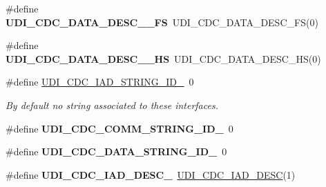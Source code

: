 \begin{DoxyCompactItemize}
\item 
\hypertarget{group__udi__cdc__group__desc_ga56e237a1c0c449161644d244877e7a95}{\#define {\bfseries U\-D\-I\-\_\-\-C\-D\-C\-\_\-\-D\-A\-T\-A\-\_\-\-D\-E\-S\-C\-\_\-\_\-\-F\-S}~U\-D\-I\-\_\-\-C\-D\-C\-\_\-\-D\-A\-T\-A\-\_\-\-D\-E\-S\-C\-\_\-\-F\-S(0)}\label{group__udi__cdc__group__desc_ga56e237a1c0c449161644d244877e7a95}

\item 
\hypertarget{group__udi__cdc__group__desc_ga396459a6e02658a9ae0d6328f0e83e5b}{\#define {\bfseries U\-D\-I\-\_\-\-C\-D\-C\-\_\-\-D\-A\-T\-A\-\_\-\-D\-E\-S\-C\-\_\-\_\-\-H\-S}~U\-D\-I\-\_\-\-C\-D\-C\-\_\-\-D\-A\-T\-A\-\_\-\-D\-E\-S\-C\-\_\-\-H\-S(0)}\label{group__udi__cdc__group__desc_ga396459a6e02658a9ae0d6328f0e83e5b}

\item 
\hypertarget{group__udi__cdc__group__desc_gae988cbd24762b9bd9d29252d2583566f}{\#define \hyperlink{group__udi__cdc__group__desc_gae988cbd24762b9bd9d29252d2583566f}{U\-D\-I\-\_\-\-C\-D\-C\-\_\-\-I\-A\-D\-\_\-\-S\-T\-R\-I\-N\-G\-\_\-\-I\-D\-\_}~0}\label{group__udi__cdc__group__desc_gae988cbd24762b9bd9d29252d2583566f}

\begin{DoxyCompactList}\small\item\em By default no string associated to these interfaces. \end{DoxyCompactList}\item 
\hypertarget{group__udi__cdc__group__desc_gac334fbfd6f399b05aa074121e4811371}{\#define {\bfseries U\-D\-I\-\_\-\-C\-D\-C\-\_\-\-C\-O\-M\-M\-\_\-\-S\-T\-R\-I\-N\-G\-\_\-\-I\-D\-\_}~0}\label{group__udi__cdc__group__desc_gac334fbfd6f399b05aa074121e4811371}

\item 
\hypertarget{group__udi__cdc__group__desc_ga2a7aba5de9d0b9c08fb660cba94b71c4}{\#define {\bfseries U\-D\-I\-\_\-\-C\-D\-C\-\_\-\-D\-A\-T\-A\-\_\-\-S\-T\-R\-I\-N\-G\-\_\-\-I\-D\-\_}~0}\label{group__udi__cdc__group__desc_ga2a7aba5de9d0b9c08fb660cba94b71c4}

\item 
\hypertarget{group__udi__cdc__group__desc_ga8e77925f23cf6539315902e71b11f0a7}{\#define {\bfseries U\-D\-I\-\_\-\-C\-D\-C\-\_\-\-I\-A\-D\-\_\-\-D\-E\-S\-C\-\_}~\hyperlink{group__udi__cdc__group__desc_ga39928ecb0423aff5f7ab70ae98eb2c94}{U\-D\-I\-\_\-\-C\-D\-C\-\_\-\-I\-A\-D\-\_\-\-D\-E\-S\-C}(1)}\label{group__udi__cdc__group__desc_ga8e77925f23cf6539315902e71b11f0a7}


\end{DoxyCompactItemize}
